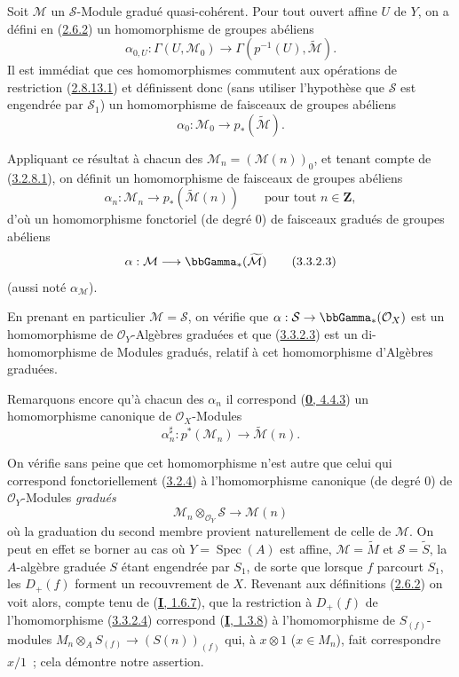 \begin{env}[3.3.2]
\label{II.3.3.2-fr}
Soit $\mathcal{M}$ un $\mathcal{S}$-Module gradué quasi-cohérent. Pour tout
ouvert affine $U$ de $Y$, on a défini en
(\hyperref[II.2.6.2-fr]{2.6.2}) un homomorphisme de groupes abéliens
\[
  \alpha_{0,U}:\Gamma(U,\mathcal{M}_0)
  \longrightarrow\Gamma(p^{-1}(U),\widetilde{\mathcal{M}}).
\]
Il est immédiat que ces homomorphismes commutent aux opérations de restriction
(\hyperref[II.2.8.13.1-fr]{2.8.13.1}) et définissent donc (sans utiliser
l'hypothèse que $\mathcal{S}$ est engendrée par $\mathcal{S}_1$) un
homomorphisme de faisceaux de groupes abéliens
\[
\label{II.3.3.2.1-fr}
  \alpha_0:\mathcal{M}_0\longrightarrow p_*(\widetilde{\mathcal{M}}).
\tag{3.3.2.1}
\]

Appliquant ce résultat à chacun des
$\mathcal{M}_n=(\mathcal{M}(n))_0$, et tenant compte de
(\hyperref[II.3.2.8.1-fr]{3.2.8.1}), on définit un homomorphisme de faisceaux
de groupes abéliens
\[
\label{II.3.3.2.2-fr}
  \alpha_n:\mathcal{M}_n\longrightarrow
  p_*(\widetilde{\mathcal{M}}(n))
  \qquad\text{pour tout }n\in\mathbf{Z},
\tag{3.3.2.2}
\]
d'où un homomorphisme fonctoriel (de degré $0$) de faisceaux gradués de groupes
abéliens
\[
\label{II.3.3.2.3-fr}
  \alpha:\mathcal{M}\longrightarrow\bbGamma_*(\widetilde{\mathcal{M}})
\tag{3.3.2.3}
\]
(aussi noté $\alpha_{\mathcal{M}}$).

En prenant en particulier $\mathcal{M}=\mathcal{S}$, on vérifie que
$\alpha:\mathcal{S}\to\bbGamma_*(\mathcal{O}_X)$ est un homomorphisme de
$\mathcal{O}_Y$-Algèbres graduées et que
(\hyperref[II.3.3.2.3-fr]{3.3.2.3}) est un di-homomorphisme de Modules
gradués, relatif à cet homomorphisme d'Algèbres graduées.

Remarquons encore qu'à chacun des $\alpha_n$ il correspond
(\hyperref[0.4.4.3-fr]{\textbf{0}, 4.4.3}) un homomorphisme canonique de
$\mathcal{O}_X$-Modules
\[
\label{II.3.3.2.4-fr}
  \alpha_n^\sharp:p^*(\mathcal{M}_n)
  \longrightarrow\widetilde{\mathcal{M}}(n).
\tag{3.3.2.4}
\]

On vérifie sans peine que cet homomorphisme n'est autre que celui qui
correspond fonctoriellement (\hyperref[II.3.2.4-fr]{3.2.4}) à
l'homomorphisme canonique (de degré $0$) de $\mathcal{O}_Y$-Modules \emph{gradués}
\[
\label{II.3.3.2.5-fr}
  \mathcal{M}_n\otimes_{\mathcal{O}_Y}\mathcal{S}
  \longrightarrow\mathcal{M}(n)
\tag{3.3.2.5}
\]
où la graduation du second membre provient naturellement de celle de
$\mathcal{M}$. On peut en effet se borner au cas où
$Y=\operatorname{Spec}(A)$ est affine, $\mathcal{M}=\widetilde{M}$ et
$\mathcal{S}=\widetilde{S}$, la $A$-algèbre graduée $S$ étant engendrée par
$S_1$, de sorte que lorsque $f$ parcourt $S_1$, les $D_+(f)$ forment un
recouvrement de $X$. Revenant aux définitions
(\hyperref[II.2.6.2-fr]{2.6.2}) on voit alors, compte tenu de
(\hyperref[I.1.6.7-fr]{\textbf{I}, 1.6.7}), que la restriction à $D_+(f)$ de
l'homomorphisme (\hyperref[II.3.3.2.4-fr]{3.3.2.4}) correspond
(\hyperref[I.1.3.8-fr]{\textbf{I}, 1.3.8}) à l'homomorphisme de $S_{(f)}$-modules
$M_n\otimes_A S_{(f)}\to(S(n))_{(f)}$ qui, à $x\otimes1$ ($x\in M_n$), fait
correspondre $x/1$~; cela démontre notre assertion.
\end{env}

